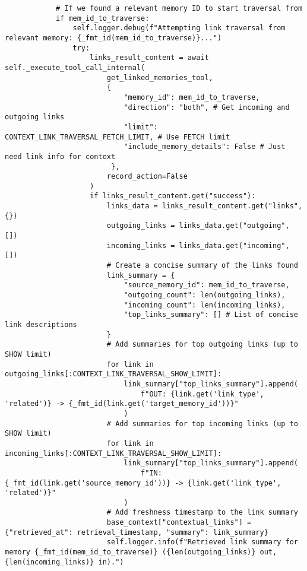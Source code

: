 \documentclass[12pt,a4paper]{article}
\begin{document}
\begin{pageablecode}
\begin{verbatim}
            # If we found a relevant memory ID to start traversal from
            if mem_id_to_traverse:
                self.logger.debug(f"Attempting link traversal from relevant memory: {_fmt_id(mem_id_to_traverse)}...")
                try:
                    links_result_content = await self._execute_tool_call_internal(
                        get_linked_memories_tool,
                        {
                            "memory_id": mem_id_to_traverse,
                            "direction": "both", # Get incoming and outgoing links
                            "limit": CONTEXT_LINK_TRAVERSAL_FETCH_LIMIT, # Use FETCH limit
                            "include_memory_details": False # Just need link info for context
                         },
                        record_action=False
                    )
                    if links_result_content.get("success"):
                        links_data = links_result_content.get("links", {})
                        outgoing_links = links_data.get("outgoing", [])
                        incoming_links = links_data.get("incoming", [])
                        # Create a concise summary of the links found
                        link_summary = {
                            "source_memory_id": mem_id_to_traverse,
                            "outgoing_count": len(outgoing_links),
                            "incoming_count": len(incoming_links),
                            "top_links_summary": [] # List of concise link descriptions
                        }
                        # Add summaries for top outgoing links (up to SHOW limit)
                        for link in outgoing_links[:CONTEXT_LINK_TRAVERSAL_SHOW_LIMIT]:
                            link_summary["top_links_summary"].append(
                                f"OUT: {link.get('link_type', 'related')} -> {_fmt_id(link.get('target_memory_id'))}"
                            )
                        # Add summaries for top incoming links (up to SHOW limit)
                        for link in incoming_links[:CONTEXT_LINK_TRAVERSAL_SHOW_LIMIT]:
                            link_summary["top_links_summary"].append(
                                f"IN: {_fmt_id(link.get('source_memory_id'))} -> {link.get('link_type', 'related')}"
                            )
                        # Add freshness timestamp to the link summary
                        base_context["contextual_links"] = {"retrieved_at": retrieval_timestamp, "summary": link_summary}
                        self.logger.info(f"Retrieved link summary for memory {_fmt_id(mem_id_to_traverse)} ({len(outgoing_links)} out, {len(incoming_links)} in).")

\end{verbatim}
\end{pageablecode}
\end{document}
